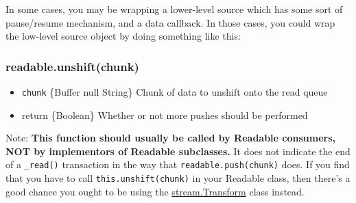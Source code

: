 In some cases, you may be wrapping a lower-level source which has some
sort of pause/resume mechanism, and a data callback. In those cases, you
could wrap the low-level source object by doing something like this:

\begin{Shaded}
\begin{Highlighting}[]

  

 \NormalTok{= }
   \NormalTok{(!}
    \NormalTok{();}
\NormalTok{\};}

 \NormalTok{= }\NormalTok{() \{}
\NormalTok{\};}

 \NormalTok{= }
  \NormalTok{();}
\NormalTok{\};}
\end{Highlighting}
\end{Shaded}

\subsubsection{readable.unshift(chunk)}

\begin{itemize}
\item
  \texttt{chunk} \{Buffer \textbar{} null \textbar{} String\} Chunk of
  data to unshift onto the read queue
\item
  return \{Boolean\} Whether or not more pushes should be performed
\end{itemize}

Note: \textbf{This function should usually be called by Readable
consumers, NOT by implementors of Readable subclasses.} It does not
indicate the end of a \texttt{\_read()} transaction in the way that
\texttt{readable.push(chunk)} does. If you find that you have to call
\texttt{this.unshift(chunk)} in your Readable class, then there's a good
chance you ought to be using the
\hyperref[stream\_class\_stream\_transform]{stream.Transform} class
instead.

